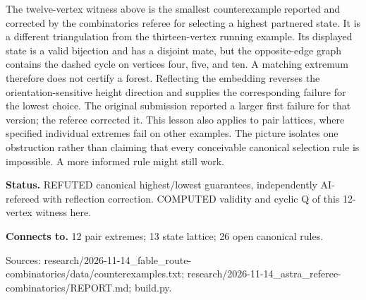 \documentclass[10pt,a4paper]{amsart}
\begin{document}
\begin{center}
\begin{minipage}{.86\textwidth}
\end{minipage}\end{center}
The twelve-vertex witness above is the smallest counterexample reported and corrected by the combinatorics referee for selecting a highest partnered state. It is a different triangulation from the thirteen-vertex running example. Its displayed state is a valid bijection and has a disjoint mate, but the opposite-edge graph contains the dashed cycle on vertices four, five, and ten. A matching extremum therefore does not certify a forest. Reflecting the embedding reverses the orientation-sensitive height direction and supplies the corresponding failure for the lowest choice. The original submission reported a larger first failure for that version; the referee corrected it. This lesson also applies to pair lattices, where specified individual extremes fail on other examples. The picture isolates one obstruction rather than claiming that every conceivable canonical selection rule is impossible. A more informed rule might still work.

\textbf{Status.} REFUTED canonical highest/lowest guarantees, independently AI-refereed with reflection correction. COMPUTED validity and cyclic Q of this 12-vertex witness here.

\textbf{Connects to.} 12 pair extremes; 13 state lattice; 26 open canonical rules.

{\footnotesize\raggedright Sources: research/\allowbreak{}2026-11-14\_fable\_route-combinatorics/\allowbreak{}data/\allowbreak{}counterexamples.txt;\allowbreak{} research/\allowbreak{}2026-11-14\_astra\_referee-combinatorics/\allowbreak{}REPORT.md;\allowbreak{} build.py.\par}
\end{document}
